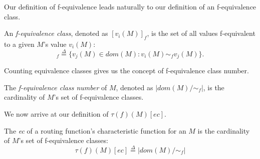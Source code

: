 



Our definition of f-equivalence leads naturally to our definition of an f-equivalence class. 
\begin{definition} An {\em f-equivalence class}, denoted as $[v_i(M)]_f$, is the set of all values f-equivalent to a given $M$'s value $v_i(M)$:
\begin{equation*}
[v_i(M)]_f \overset{\Delta}{=} \{v_j(M) \in dom(M) : v_i(M) \sim_f v_j(M)\}.
\end{equation*}
\end{definition}

Counting equivalence classes gives us the concept of f-equivalence class number.
 
\begin{definition}
The {\em f-equivalence class number} of $M$, denoted as $|dom(M)/\sim_f|$, is the cardinality of $M$'s set of f-equivalence classes. 
\end{definition}

We now arrive at our definition of $\tau(f)(M)[ec]$.

\begin{definition} The {\em ec} of a routing function's characteristic function for an $M$ is the cardinality of $M$'s set of f-equivalence classes: 
\begin{equation*}
\tau(f)(M)[ec] \overset{\Delta}{=} |dom(M)/\sim_f|
\end{equation*}
\end{definition}

